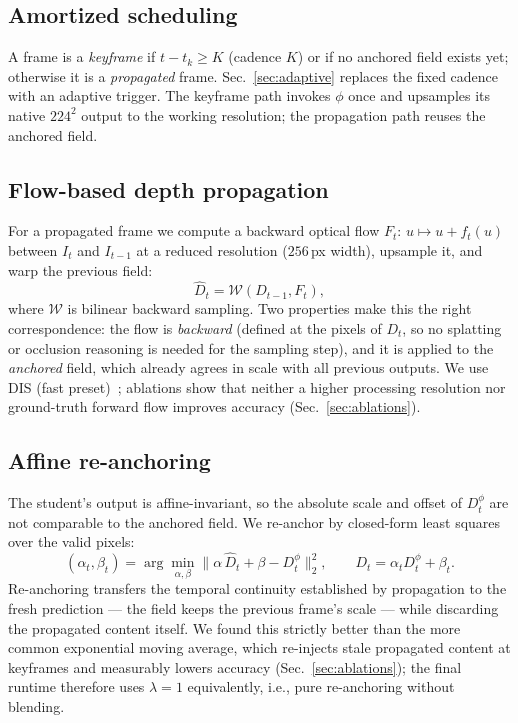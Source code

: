 \documentclass[10pt,twocolumn]{article}
\begin{document}
\subsection{Amortized scheduling}
A frame is a \emph{keyframe} if $t - t_k \geq K$ (cadence $K$) or if no
anchored field exists yet; otherwise it is a \emph{propagated} frame.
Sec.~\ref{sec:adaptive} replaces the fixed cadence with an adaptive trigger.
The keyframe path invokes $\phi$ once and upsamples its native $224^2$ output
to the working resolution; the propagation path reuses the anchored field.

\subsection{Flow-based depth propagation}
For a propagated frame we compute a backward optical flow
$F_t:\, u \mapsto u + f_t(u)$ between $I_t$ and $I_{t-1}$ at a reduced
resolution ($256$\,px width), upsample it, and warp the previous field:
\begin{equation}
  \hat{D}_t = \mathcal{W}(D_{t-1}, F_t),
  \label{eq:warp}
\end{equation}
where $\mathcal{W}$ is bilinear backward sampling. Two properties make this
the right correspondence: the flow is \emph{backward} (defined at the pixels
of $D_t$, so no splatting or occlusion reasoning is needed for the sampling
step), and it is applied to the \emph{anchored} field, which already agrees
in scale with all previous outputs. We use DIS (fast preset)~\cite{disflow};
ablations show that neither a higher processing resolution nor ground-truth
forward flow improves accuracy (Sec.~\ref{sec:ablations}).

\subsection{Affine re-anchoring}
The student's output is affine-invariant, so the absolute scale and offset of
$D^{\phi}_t$ are not comparable to the anchored field. We re-anchor by
closed-form least squares over the valid pixels:
\begin{equation}
  (\alpha_t, \beta_t) = \arg\min_{\alpha,\beta}
    \big\lVert \alpha\, \hat{D}_t + \beta - D^{\phi}_t \big\rVert^2_2,
  \qquad
  D_t = \alpha_t D^{\phi}_t + \beta_t .
  \label{eq:reanchor}
\end{equation}
Re-anchoring transfers the temporal continuity established by propagation to
the fresh prediction --- the field keeps the previous frame's scale --- while
discarding the propagated content itself. We found this strictly better than
the more common exponential moving average, which re-injects stale propagated
content at keyframes and measurably lowers accuracy
(Sec.~\ref{sec:ablations}); the final runtime therefore uses $\lambda=1$
equivalently, i.e., pure re-anchoring without blending.
\end{document}
